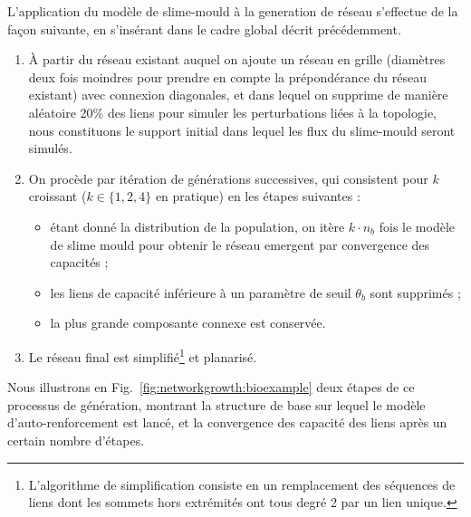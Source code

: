 L'application du modèle de slime-mould à la generation de réseau s'effectue de la façon suivante, en s'insérant dans le cadre global décrit précédemment.

\begin{enumerate}
	\item À partir du réseau existant auquel on ajoute un réseau en grille (diamètres deux fois moindres pour prendre en compte la prépondérance du réseau existant) avec connexion diagonales, et dans lequel on supprime de manière aléatoire 20\% des liens pour simuler les perturbations liées à la topologie, nous constituons le support initial dans lequel les flux du slime-mould seront simulés.
	\item On procède par itération de générations successives, qui consistent pour $k$ croissant ($k\in \{ 1,2,4 \}$ en pratique) en les étapes suivantes :
	\begin{itemize}
		\item étant donné la distribution de la population, on itère $k\cdot n_b$ fois le modèle de slime mould pour obtenir le réseau emergent par convergence des capacités ;
		\item les liens de capacité inférieure à un paramètre de seuil $\theta_b$ sont supprimés ;
		\item la plus grande composante connexe est conservée.
	\end{itemize}
	\item Le réseau final est simplifié\footnote{L'algorithme de simplification consiste en un remplacement des séquences de liens dont les sommets hors extrémités ont tous degré 2 par un lien unique.} et planarisé.
\end{enumerate}

Nous illustrons en Fig.~\ref{fig:networkgrowth:bioexample} deux étapes de ce processus de génération, montrant la structure de base sur lequel le modèle d'auto-renforcement est lancé, et la convergence des capacité des liens après un certain nombre d'étapes.



